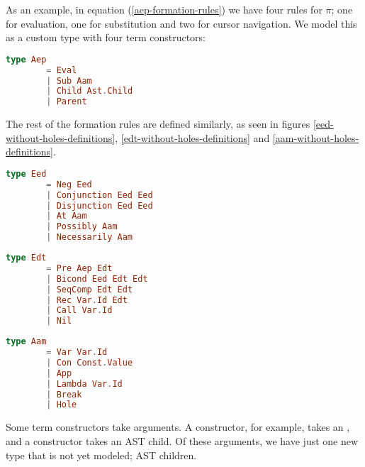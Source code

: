 As an example, in equation (\ref{aep-formation-rules}) we have four rules for $\pi$; one
for evaluation, one for substitution and two for cursor navigation. We model
this as a custom type with four term constructors:

\begin{lstlisting}[language=elm,%
                   label={aep-without-holes-definition},%
                   gobble=4,%
                   caption={Formation rules (\ref{aep-formation-rules}) modeled in Elm},%
                   ]
    type Aep
        = Eval
        | Sub Aam
        | Child Ast.Child
        | Parent
\end{lstlisting}

The rest of the formation rules are defined similarly, as seen in figures
\ref{eed-without-holes-definitions}, \ref{edt-without-holes-definitions} and
\ref{aam-without-holes-definitions}.

\begin{lstlisting}[language=elm,%
           label={eed-without-holes-definitions},%
           gobble=4,%
           caption={Formation rules (\ref{eed-formation-rules}) modeled in Elm},%
           ]
    type Eed
        = Neg Eed
        | Conjunction Eed Eed
        | Disjunction Eed Eed
        | At Aam
        | Possibly Aam
        | Necessarily Aam
\end{lstlisting}

\begin{lstlisting}[language=elm,%
           label={edt-without-holes-definitions},%
           gobble=4,%
           caption={Formation rules (\ref{edt-formation-rules}) modeled in Elm},%
           ]
    type Edt
        = Pre Aep Edt
        | Bicond Eed Edt Edt
        | SeqComp Edt Edt
        | Rec Var.Id Edt
        | Call Var.Id
        | Nil
\end{lstlisting}

\begin{lstlisting}[language=elm,%
           label={aam-without-holes-definitions},%
           gobble=4,%
           caption={Formation rules (\ref{aam-formation-rules}) modeled in Elm},%
           ]
    type Aam
        = Var Var.Id
        | Con Const.Value
        | App
        | Lambda Var.Id
        | Break
        | Hole
\end{lstlisting}

Some term constructors take arguments. A  constructor, for example,
takes an , and a  constructor takes an AST child. Of these
arguments, we have just one new type that is not yet modeled; AST children.

